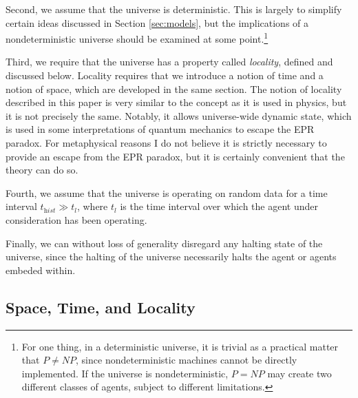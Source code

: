\documentclass[12pt]{article}
\theoremstyle{definition}
\begin{document}
Second, we assume that the universe is deterministic. This is largely to
simplify certain ideas discussed in Section \ref{sec:models}, but the
implications of a nondeterministic universe should be examined at some
point.\footnote{For one thing, in a deterministic universe, it is trivial as a
practical matter that \(P \not= \mathit{NP}\), since nondeterministic machines
cannot be directly implemented. If the universe is nondeterministic, \(P =
\mathit{NP}\) may create two different classes of agents, subject to different
limitations.}%

Third, we require that the universe has a property called \textit{locality},
defined and discussed below. Locality requires that we introduce a notion of
time and a notion of space\footnotemark, which are developed in the same
section. The notion of locality described in this paper is very similar to the
concept as it is used in physics, but it is not precisely the same. Notably, it
allows universe-wide dynamic state, which is used in some interpretations of
quantum mechanics to escape the EPR paradox. For metaphysical reasons I do not
believe it is strictly necessary to provide an escape from the EPR paradox, but
it is certainly convenient that the theory can do so.


Fourth, we assume that the universe is operating on random data for a time
interval \(t_\textit{hist} \gg t_l\), where \(t_l\) is the time interval over
which the agent under consideration has been operating.

Finally, we can without loss of generality disregard any halting state of the
universe, since the halting of the universe necessarily halts the agent or
agents embeded within.


\subsection{Space, Time, and Locality}
\label{sec:locality}
\end{document}

